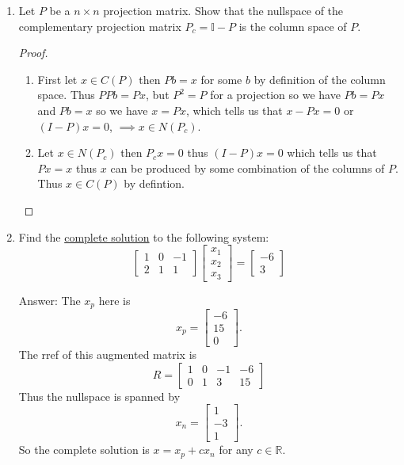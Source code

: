 \documentclass[10pt, a4paper]{article}
\theoremstyle{break}
\begin{document}
\begin{enumerate}
\item Let $P$ be a $n \times n$ projection matrix. Show that the nullspace of the complementary projection matrix $P_c=\mathbb{I}-P$ is the column space of $P$. 

\begin{proof}
\begin{enumerate}
\item First let $x \in C(P)$ then $Pb=x$ for some $b$ by definition of the column space. Thus $PPb=Px$, but $P^2=P$ for a projection so we have $Pb=Px$ and $Pb=x$ so we have $x=Px$, which tells us that $x-Px=0$ or $(I-P)x=0$, $\implies x \in N(P_c)$.
\item Let $x \in N(P_c)$ then $P_cx=0$ thus $(I-P)x=0$ which tells us that $Px=x$ thus $x$ can be produced by some combination of the columns of $P$. Thus $x\in C(P)$ by defintion. 
\end{enumerate}
\end{proof}


\item Find the \underline{complete solution} to the following system:
$$
\begin{bmatrix}
1 & 0 & -1 \\
2 & 1 & 1
\end{bmatrix}
\begin{bmatrix}
x_1 \\
x_2 \\
x_3
\end{bmatrix}
=
\begin{bmatrix}
-6 \\
3
\end{bmatrix} 
$$



Answer: The $x_p$ here is $$x_p=\begin{bmatrix} -6 \\15\\ 0 \end{bmatrix}.$$ The rref of this augmented matrix is 
\begin{equation}
R=
\begin{bmatrix}
1&0&-1&-6\\
0&1&3&15
\end{bmatrix}
\end{equation}
Thus the nullspace is spanned by $$x_n=\begin{bmatrix} 1\\-3\\1 \end{bmatrix}.$$So the complete solution is $x=x_p+c x_n$ for any $c \in \mathbb{R}$. 







\end{enumerate}
\end{document}
